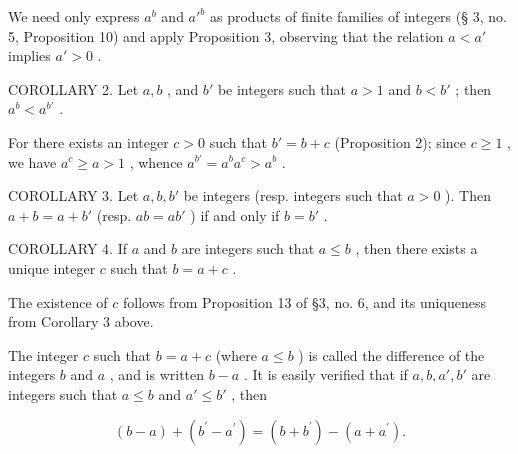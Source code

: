 We need only express \(a^b\) and \(a'^b\) as products of finite families of integers (§ 3, no. 5, Proposition 10) and apply Proposition 3, observing that the relation \(a < a'\) implies \(a' > 0\) .

COROLLARY 2. Let \(a, b\) , and \(b'\) be integers such that \(a > 1\) and \(b < b'\) ; then \(a^b < a^{b'}\) .

For there exists an integer \(c > 0\) such that \(b' = b + c\) (Proposition 2); since \(c \geqslant 1\) , we have \(a^c \geqslant a > 1\) , whence \(a^{b'} = a^b a^c > a^b\) .

COROLLARY 3. Let \(a, b, b'\) be integers (resp. integers such that \(a > 0\) ). Then \(a + b = a + b'\) (resp. \(ab = ab'\) ) if and only if \(b = b'\) .

COROLLARY 4. If \(a\) and \(b\) are integers such that \(a \leqslant b\) , then there exists a unique integer \(c\) such that \(b = a + c\) .

The existence of \(c\) follows from Proposition 13 of §3, no. 6, and its uniqueness from Corollary 3 above.

The integer \(c\) such that \(b = a + c\) (where \(a \leqslant b\) ) is called the difference of the integers \(b\) and \(a\) , and is written \(b - a\) . It is easily verified that if \(a, b, a', b'\) are integers such that \(a \leqslant b\) and \(a' \leqslant b'\) , then

\[
(b - a) + (b ^ {\prime} - a ^ {\prime}) = (b + b ^ {\prime}) - (a + a ^ {\prime}).
\]

